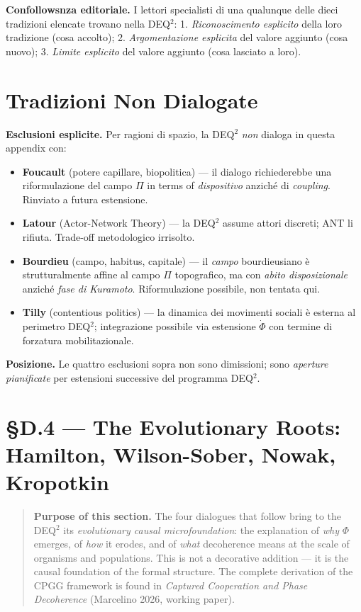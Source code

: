 \Proved{} \textbf{Confollowsnza editoriale.} I lettori specialisti di una
qualunque delle dieci tradizioni elencate trovano nella DEQ$^2$: 1.
\emph{Riconoscimento esplicito} della loro tradizione (cosa accolto); 2.
\emph{Argomentazione esplicita} del valore aggiunto (cosa nuovo); 3.
\emph{Limite esplicito} del valore aggiunto (cosa lasciato a loro).



\section{Tradizioni Non Dialogate}\label{tradizioni-non-dialogate}

\Conj{} \textbf{Esclusioni esplicite.} Per ragioni di spazio, la DEQ$^2$
\emph{non} dialoga in questa appendix con:

\begin{itemize}
\tightlist
\item
  \textbf{Foucault} (potere capillare, biopolitica) --- il dialogo
  richiederebbe una riformulazione del campo \(\Pi\) in terms of
  \emph{dispositivo} anziché di \emph{coupling}. Rinviato a futura
  estensione.
\item
  \textbf{Latour} (Actor-Network Theory) --- la DEQ$^2$ assume attori
  discreti; ANT li rifiuta. Trade-off metodologico irrisolto.
\item
  \textbf{Bourdieu} (campo, habitus, capitale) --- il \emph{campo}
  bourdieusiano è strutturalmente affine al campo \(\Pi\) topografico,
  ma con \emph{abito disposizionale} anziché \emph{fase di Kuramoto}.
  Riformulazione possibile, non tentata qui.
\item
  \textbf{Tilly} (contentious politics) --- la dinamica dei movimenti
  sociali è esterna al perimetro DEQ$^2$; integrazione possibile via
  estensione \(\dot\Phi\) con termine di forzatura mobilitazionale.
\end{itemize}

\Proved{} \textbf{Posizione.} Le quattro esclusioni sopra non sono
dimissioni; sono \emph{aperture pianificate} per estensioni successive
del programma DEQ$^2$.



\section{§D.4 --- The Evolutionary Roots: Hamilton, Wilson-Sober, Nowak, Kropotkin}\label{d4-radici-evolutive}

\begin{quote}
\textbf{Purpose of this section.} The four dialogues that follow bring
to the DEQ$^2$ its \emph{evolutionary causal microfoundation}: the
explanation of \emph{why} $\Phi$ emerges, of \emph{how} it erodes, and
of \emph{what} decoherence means at the scale of organisms and
populations. This is not a decorative addition --- it is the causal
foundation of the formal structure. The complete derivation of the CPGG
framework is found in \emph{Captured Cooperation and Phase Decoherence}
(Marcelino 2026, working paper).
\end{quote}

